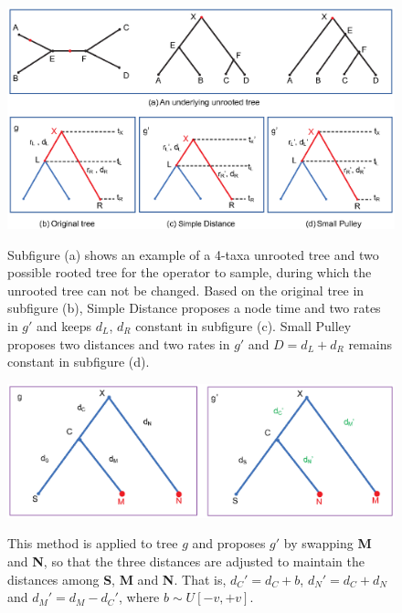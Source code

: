 \documentclass{bmcart}
\begin{document}
\begin{backmatter}
\begin{figure}[h!]
\includegraphics[width=12cm]{Fig03-rootstrategy.eps}\\
\caption{
             Subfigure (a) shows an example of a 4-taxa unrooted tree and two possible rooted tree for the operator to sample, during which the unrooted tree can not be changed. Based on the original tree in subfigure (b), Simple Distance proposes a node time and two rates in ${g}'$ and keeps $d_L$, $d_R$ constant in subfigure (c). Small Pulley proposes two distances and two rates in ${g}'$ and $D = {d_L} + {d_R}$ remains constant in subfigure (d).}
\label{simpledistance}
\end{figure}


\begin{figure}[h!]
\includegraphics[width=12cm]{Fig04-exchangemethod.eps}\\
\caption{
             This method is applied to tree $g$ and proposes $g'$ by swapping \textbf{M} and \textbf{N}, so that the three distances are adjusted to maintain the distances among \textbf{S}, \textbf{M} and \textbf{N}. That is, ${d_C}' = {d_C} + b$, ${d_N}' = d_C + d_N$ and ${d_M}' = d_{M} - {d_C}'$, where $b \sim U[ - v, + v]$.}
\label{exchangemethod}
\end{figure}


\end{backmatter}
\end{document}

